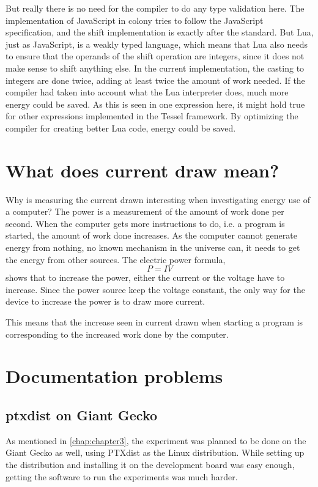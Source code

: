 But really there is no need for the compiler to do any type validation here.
The implementation of JavaScript in colony tries to follow the JavaScript specification, and the shift implementation is exactly after the standard.
But Lua, just as JavaScript, is a weakly typed language, which means that Lua also needs to ensure that the operands of the shift operation are integers, since it does not make sense to shift anything else.
In the current implementation, the casting to integers are done twice, adding at least twice the amount of work needed.
If the compiler had taken into account what the Lua interpreter does, much more energy could be saved.
As this is seen in one expression here, it might hold true for other expressions implemented in the Tessel framework.
By optimizing the compiler for creating better Lua code, energy could be saved.


\section{What does current draw mean?}
Why is measuring the current drawn interesting when investigating energy use of a computer?
The power is a measurement of the amount of work done per second.
When the computer gets more instructions to do, i.e. a program is started, the amount of work done increases.
As the computer cannot generate energy from nothing, no known mechanism in the universe can, it needs to get the energy from other sources.
The electric power formula,
\[P = IV\]
shows that to increase the power, either the current or the voltage have to increase.
Since the power source keep the voltage constant, the only way for the device to increase the power is to draw more current.

This means that the increase seen in current drawn when starting a program is corresponding to the increased work done by the computer.



\section{Documentation problems}

\subsection{ptxdist on Giant Gecko}
As mentioned in \cref{chap:chapter3}, the experiment was planned to be done on the Giant Gecko as well, using PTXdist as the Linux distribution.
While setting up the distribution and installing it on the development board was easy enough, getting the software to run the experiments was much harder.

